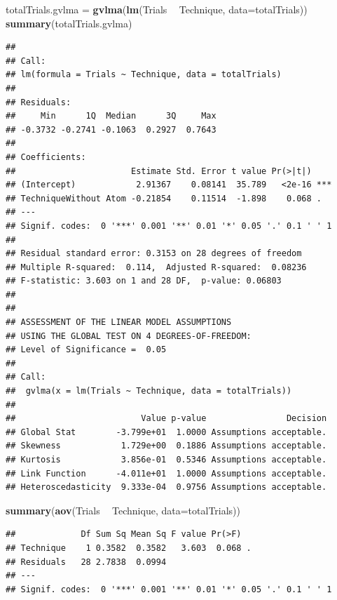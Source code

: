 \documentclass[]{article}
\newenvironment{Shaded}{\begin{snugshade}}{\end{snugshade}}
\newcommand{\DataTypeTok}[1]{\textcolor[rgb]{0.13,0.29,0.53}{#1}}
\newcommand{\KeywordTok}[1]{\textcolor[rgb]{0.13,0.29,0.53}{\textbf{#1}}}
\newcommand{\NormalTok}[1]{#1}
\newcommand{\OperatorTok}[1]{\textcolor[rgb]{0.81,0.36,0.00}{\textbf{#1}}}
\newcommand{\StringTok}[1]{\textcolor[rgb]{0.31,0.60,0.02}{#1}}
\begin{document}
\begin{Shaded}
\begin{Highlighting}[]
\NormalTok{totalTrials.gvlma =}\StringTok{ }\KeywordTok{gvlma}\NormalTok{(}\KeywordTok{lm}\NormalTok{(Trials }\OperatorTok{~}\StringTok{ }\NormalTok{Technique, }\DataTypeTok{data=}\NormalTok{totalTrials))}
\KeywordTok{summary}\NormalTok{(totalTrials.gvlma)}
\end{Highlighting}
\end{Shaded}

\begin{verbatim}
## 
## Call:
## lm(formula = Trials ~ Technique, data = totalTrials)
## 
## Residuals:
##     Min      1Q  Median      3Q     Max 
## -0.3732 -0.2741 -0.1063  0.2927  0.7643 
## 
## Coefficients:
##                       Estimate Std. Error t value Pr(>|t|)    
## (Intercept)            2.91367    0.08141  35.789   <2e-16 ***
## TechniqueWithout Atom -0.21854    0.11514  -1.898    0.068 .  
## ---
## Signif. codes:  0 '***' 0.001 '**' 0.01 '*' 0.05 '.' 0.1 ' ' 1
## 
## Residual standard error: 0.3153 on 28 degrees of freedom
## Multiple R-squared:  0.114,  Adjusted R-squared:  0.08236 
## F-statistic: 3.603 on 1 and 28 DF,  p-value: 0.06803
## 
## 
## ASSESSMENT OF THE LINEAR MODEL ASSUMPTIONS
## USING THE GLOBAL TEST ON 4 DEGREES-OF-FREEDOM:
## Level of Significance =  0.05 
## 
## Call:
##  gvlma(x = lm(Trials ~ Technique, data = totalTrials)) 
## 
##                         Value p-value                Decision
## Global Stat        -3.799e+01  1.0000 Assumptions acceptable.
## Skewness            1.729e+00  0.1886 Assumptions acceptable.
## Kurtosis            3.856e-01  0.5346 Assumptions acceptable.
## Link Function      -4.011e+01  1.0000 Assumptions acceptable.
## Heteroscedasticity  9.333e-04  0.9756 Assumptions acceptable.
\end{verbatim}

\begin{Shaded}
\begin{Highlighting}[]
\KeywordTok{summary}\NormalTok{(}\KeywordTok{aov}\NormalTok{(Trials }\OperatorTok{~}\StringTok{ }\NormalTok{Technique, }\DataTypeTok{data=}\NormalTok{totalTrials))}
\end{Highlighting}
\end{Shaded}

\begin{verbatim}
##             Df Sum Sq Mean Sq F value Pr(>F)  
## Technique    1 0.3582  0.3582   3.603  0.068 .
## Residuals   28 2.7838  0.0994                 
## ---
## Signif. codes:  0 '***' 0.001 '**' 0.01 '*' 0.05 '.' 0.1 ' ' 1
\end{verbatim}
\end{document}
